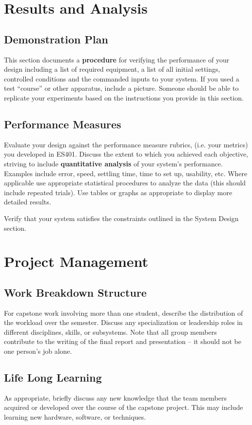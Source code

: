 \documentclass{wrcecapstone}
\begin{document}
\section{Results and Analysis}

\subsection{Demonstration Plan}
This section documents a \textbf{procedure} for verifying the performance of your design including a list of required equipment, a list of all initial settings, controlled conditions and the commanded inputs to your system. If you used a test “course” or other apparatus, include a picture.  Someone should be able to replicate your experiments based on the instructions you provide in this section.  

\subsection{Performance Measures}
Evaluate your design against the performance measure rubrics, (i.e. your metrics) you developed in ES401. Discuss the extent to which you achieved each objective, striving to include \textbf{quantitative analysis} of your system’s performance. Examples include error, speed, settling time, time to set up, usability, etc. Where applicable use appropriate statistical procedures to analyze the data (this should include repeated trials). Use tables or graphs as appropriate to display more detailed results.  

Verify that your system satisfies the constraints outlined in the System Design section.




\section{Project Management}

\subsection{Work Breakdown Structure}
For capstone work involving more than one student, describe the distribution of the workload over the semester. Discuss any specialization or leadership roles in different disciplines, skills, or subsystems. Note that all group members contribute to the writing of the final report and presentation – it should not be one person’s job alone.  

\subsection{Life Long Learning}
As appropriate, briefly discuss any new knowledge that the team members acquired or developed over the course of the capstone project. This may include learning new hardware, software, or techniques.
\end{document}
